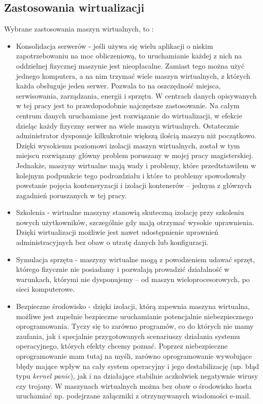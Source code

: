 \documentclass[10pt,a4paper,titlepage,twoside]{report}
\begin{document}
\subsection{Zastosowania wirtualizacji}\indent \indent Wybrane zastosowania maszyn wirtualnych, to \cite{ad15}:
\begin{itemize}
	\item Konsolidacja serwerów - jeśli używa się wielu aplikacji o niskim zapotrzebowaniu na moc obliczeniową, to uruchamianie każdej z nich na oddzielnej fizycznej maszynie jest nieopłacalne. Zamiast tego można użyć jednego komputera, a na nim trzymać wiele maszyn wirtualnych, z których każda obsługuje jeden serwer. Pozwala to na oszczędność miejsca, serwisowania, zarządzania, energii i sprzętu. W centrach danych opisywanych w tej pracy jest to prawdopodobnie najczęstsze zastosowanie. Na całym centrum danych uruchamiane jest rozwiązanie do wirtualizacji, w efekcie dzieląc każdy fizyczny serwer na wiele maszyn wirtualnych. Ostatecznie administrator dysponuje kilkukrotnie większą ilością maszyn niż początkowo. Dzięki wysokiemu poziomowi izolacji maszyn wirtualnych, został w tym miejscu rozwiązany główny problem poruszany w mojej pracy magisterskiej. Jednakże, maszyny wirtualne mają wady i problemy, które przedtstawiłem w kolejnym podpunkcie tego podrozdziału i które to problemy spowodowały powstanie pojęcia konteneryzacji i izolacji kontenerów – jednym z głównych zagadnień poruszanych w tej pracy.
	\item Szkolenia - wirtualne maszyny stanowią skuteczną izolację przy szkoleniu nowych użytkowników, szczególnie gdy mają otrzymać wysokie uprawnienia. Dzięki wirtualizacji możliwie jest nawet udostępnienie uprawnień administracyjnych bez obaw o utratę danych lub konfiguracji.
	\item Symulacja sprzętu - maszyny wirtualne mogą z powodzeniem udawać sprzęt, którego fizycznie nie posiadamy i pozwalają prowadzić działalność w warunkach, którymi nie dysponujemy – od maszyn wieloprocesorowych, po sieci komputerowe.
	\item Bezpieczne środowisko - dzięki izolacji, którą zapewnia maszyna wirtualna, możliwe jest zupełnie bezpieczne uruchamianie potencjalnie niebezpiecznego oprogramowania. Tyczy się to zarówno programów, co do których nie mamy zaufania, jak i specjalnie przygotowanych scenariuszy działania systemu operacyjnego, których efekty chcemy poznać. Poprzez niebezpieczne oprogramowanie mam tutaj na myśli, zarówno oprogramowanie wywołujące błędy mające wpływ na cały system operacyjny i jego destabilizację (np. błąd typu \textit{kernel panic}), jak i na działające stabilnie aczkolwiek negatywnie wirusy czy trojany. W maszynach wirtualnych można bez obaw o środowisko hosta uruchamiać np. podejrzane załączniki z otrzymywanych wiadomości e-mail.

\end{itemize}
\end{document}
